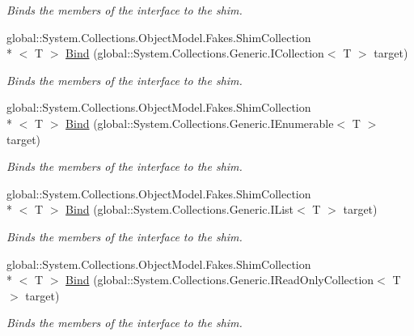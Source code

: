 \begin{DoxyCompactItemize}
\begin{DoxyCompactList}\small\item\em Binds the members of the interface to the shim.\end{DoxyCompactList}\item 
global\-::\-System.\-Collections.\-Object\-Model.\-Fakes.\-Shim\-Collection\\*
$<$ T $>$ \hyperlink{class_system_1_1_collections_1_1_object_model_1_1_fakes_1_1_shim_collection_3_01_t_01_4_a3af16ccc317b1f981ee2368c186da69e}{Bind} (global\-::\-System.\-Collections.\-Generic.\-I\-Collection$<$ T $>$ target)
\begin{DoxyCompactList}\small\item\em Binds the members of the interface to the shim.\end{DoxyCompactList}\item 
global\-::\-System.\-Collections.\-Object\-Model.\-Fakes.\-Shim\-Collection\\*
$<$ T $>$ \hyperlink{class_system_1_1_collections_1_1_object_model_1_1_fakes_1_1_shim_collection_3_01_t_01_4_a0d91bc0a4699ad5c5b21d4f6ed617539}{Bind} (global\-::\-System.\-Collections.\-Generic.\-I\-Enumerable$<$ T $>$ target)
\begin{DoxyCompactList}\small\item\em Binds the members of the interface to the shim.\end{DoxyCompactList}\item 
global\-::\-System.\-Collections.\-Object\-Model.\-Fakes.\-Shim\-Collection\\*
$<$ T $>$ \hyperlink{class_system_1_1_collections_1_1_object_model_1_1_fakes_1_1_shim_collection_3_01_t_01_4_a11ccad411ed8ffff351dc05625cd9e20}{Bind} (global\-::\-System.\-Collections.\-Generic.\-I\-List$<$ T $>$ target)
\begin{DoxyCompactList}\small\item\em Binds the members of the interface to the shim.\end{DoxyCompactList}\item 
global\-::\-System.\-Collections.\-Object\-Model.\-Fakes.\-Shim\-Collection\\*
$<$ T $>$ \hyperlink{class_system_1_1_collections_1_1_object_model_1_1_fakes_1_1_shim_collection_3_01_t_01_4_a2581ead66bf4002fc967756edf1d66bc}{Bind} (global\-::\-System.\-Collections.\-Generic.\-I\-Read\-Only\-Collection$<$ T $>$ target)
\begin{DoxyCompactList}\small\item\em Binds the members of the interface to the shim.\end{DoxyCompactList}\item 

\end{DoxyCompactItemize}
